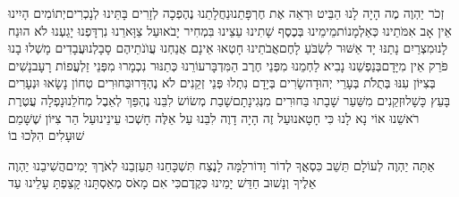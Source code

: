 \documentclass[../main/main.tex]{subfiles}
\begin{document}
\begin{multicols*}{\ncols}
זְכֹר יַהְוֶה מֶה הָיָה לָנוּ הַבֵּיט וּרְאֵה אֶת חֶרְפָּתֵנוּ\PreVerseSpace{}נַחֲלָתֵנוּ נֶהֶפְכָה לְזָרִים בָּתֵּינוּ לְנָכְרִים\PreVerseSpace{}יְתוֹמִים הָיִינוּ אֵין אָב אִמֹּתֵינוּ כְּאַלְמָנוֹת\PreVerseSpace{}מֵימֵינוּ בְּכֶסֶף שָׁתִינוּ עֵצֵינוּ בִּמְחִיר יָבֹאוּ\PreVerseSpace{}עַל צַוָּארֵנוּ נִרְדָּפְנוּ יָגַעְנוּ לֹא הוּנַח לָנוּ\PreVerseSpace{}מִצְרַיִם נָתַנּוּ יָד אַשּׁוּר לִשְׂבֹּעַ לָחֶם\PreVerseSpace{}אֲבֹתֵינוּ חָטְאוּ אֵינָם אֲנַחְנוּ עֲוֺנֹתֵיהֶם סָבָלְנוּ\PreVerseSpace{}עֲבָדִים מָשְׁלוּ בָנוּ פֹּרֵק אֵין מִיָּדָם\PreVerseSpace{}בְּנַפְשֵׁנוּ נָבִיא לַחְמֵנוּ מִפְּנֵי חֶרֶב הַמִּדְבָּר\PreVerseSpace{}עוֹרֵנוּ כְּתַנּוּר נִכְמָרוּ מִפְּנֵי זַלְעֲפוֹת רָעָב\PreVerseSpace{}נָשִׁים בְּצִיּוֹן עִנּוּ בְּתֻלֹת בְּעָרֵי יְהוּדָה\PreVerseSpace{}שָׂרִים בְּיָדָם נִתְלוּ פְּנֵי זְקֵנִים לֹא נֶהְדָּרוּ\PreVerseSpace{}בַּחוּרִים טְחוֹן נָשָׂאוּ וּנְעָרִים בָּעֵץ כָּשָׁלוּ\PreVerseSpace{}זְקֵנִים מִשַּׁעַר שָׁבָתוּ בַּחוּרִים מִנְּגִינָתָם\PreVerseSpace{}שָׁבַת מְשׂוֹשׂ לִבֵּנוּ נֶהְפַּךְ לְאֵבֶל מְחֹלֵנוּ\PreVerseSpace{}נָפְלָה עֲטֶרֶת רֹאשֵׁנוּ אוֹי נָא לָנוּ כִּי חָטָאנוּ\PreVerseSpace{}עַל זֶה הָיָה דָוֶה לִבֵּנוּ עַל אֵלֶּה חָשְׁכוּ עֵינֵינוּ\PreVerseSpace{}עַל הַר צִיּוֹן שֶׁשָּׁמֵם שׁוּעָלִים הִלְּכוּ בוֹ\OpenSection{}\par
{}אַתָּה יַהְוֶה לְעוֹלָם תֵּשֵׁב כִּסְאֲךָ לְדוֹר וָדוֹר\PreVerseSpace{}לָמָּה לָנֶצַח תִּשְׁכָּחֵנוּ תַּעַזְבֵנוּ לְאֹרֶךְ יָמִים\PreVerseSpace{}הֲשִׁיבֵנוּ יַהְוֶה אֵלֶיךָ וְנָשׁוּב חַדֵּשׁ יָמֵינוּ כְּקֶדֶם\PreVerseSpace{}כִּי אִם מָאֹס מְאַסְתָּנוּ קָצַפְתָּ עָלֵינוּ עַד\par
\end{multicols*}
\end{document}

